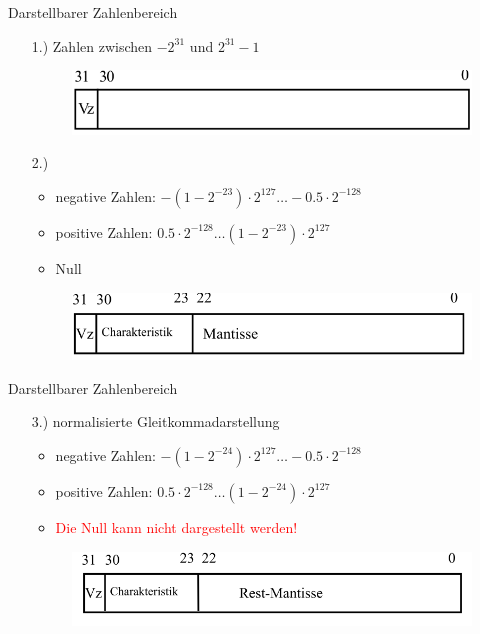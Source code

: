 \documentclass[12pt%
,aspectratio=169%
]{beamer}
\begin{document}
\begin{frame}{Darstellbarer Zahlenbereich}
\begin{itemize}
	\item[1.)] Zahlen zwischen $-2^{31}$ und $2^{31}-1$
	\begin{figure}
		\includegraphics[scale=0.3]{pictures/format_a}
	\end{figure}
	\item[2.)]~\\
	\begin{itemize}
	\item negative Zahlen: $-(1-2^{-23}) \cdot 2^{127} \ldots -0.5 \cdot 2^{-128}$
	\item positive Zahlen: $0.5 \cdot 2^{-128} \ldots (1-2^{-23}) \cdot 2^{127}$
	\item Null
	\end{itemize}
	\begin{figure}
		\includegraphics[scale=0.3]{pictures/format_b}
	\end{figure}
\end{itemize}
\end{frame}

\begin{frame}{Darstellbarer Zahlenbereich}
\begin{itemize}
	\item[3.)] normalisierte Gleitkommadarstellung
	\begin{itemize}
	\item negative Zahlen: $-(1-2^{-24}) \cdot 2^{127} \ldots -0.5 \cdot 2^{-128}$
	\item positive Zahlen: $0.5 \cdot 2^{-128} \ldots (1-2^{-24}) \cdot 2^{127}$
	\item \textcolor{red}{Die Null kann nicht dargestellt werden!}
	\end{itemize}
	\begin{figure}
		\includegraphics[scale=0.3]{pictures/format_c}
	\end{figure}
\end{itemize}
\end{frame}
\end{document}
